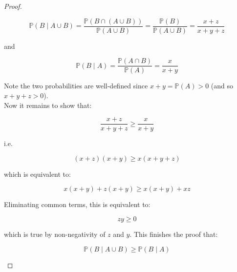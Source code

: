 \begin{proof}
\begin{itemize}
  \[\mathbb{P}(\mathit{B} \mid \mathit{A} \cup \mathit{B}) = \frac{\mathbb{P}(\mathit{B} \cap (\mathit{A} \cup \mathit{B}))}{\mathbb{P}(\mathit{A} \cup \mathit{B})} = \frac{\mathbb{P}(\mathit{B})}{\mathbb{P}(\mathit{A} \cup \mathit{B})} = \frac{\mathit{x} + \mathit{z}}{\mathit{x} + \mathit{y} + \mathit{z}}\]

  and

  \[\mathbb{P}(\mathit{B} \mid \mathit{A}) = \frac{\mathbb{P}(\mathit{A} \cap \mathit{B})}{\mathbb{P}(\mathit{A})} = \frac{\mathit{x}}{\mathit{x} + \mathit{y}}\]

  Note the two probabilities are well-defined since \(\mathit{x} + \mathit{y} = \mathbb{P}(\mathit{A}) > 0\) (and so \(\mathit{x} + \mathit{y} + \mathit{z} > 0\)).\\
  Now it remains to show that:

  \[\frac{\mathit{x} + \mathit{z}}{\mathit{x} + \mathit{y} + \mathit{z}} \geq \frac{\mathit{x}}{\mathit{x} + \mathit{y}}\]

  i.e.

  \[(\mathit{x} + \mathit{z})(\mathit{x} + \mathit{y}) \geq \mathit{x}(\mathit{x} + \mathit{y} + \mathit{z})\]

  which is equivalent to:

  \[\mathit{x}(\mathit{x} + \mathit{y}) + \mathit{z}(\mathit{x} + \mathit{y}) \geq \mathit{x}(\mathit{x} + \mathit{y}) + \mathit{x}\mathit{z}\]

  Eliminating common terms, this is equivalent to:

  \[\mathit{z}\mathit{y} \geq 0\]

  which is true by non-negativity of \(\mathit{z}\) and \(\mathit{y}\). This finishes the proof that:

  \[\mathbb{P}(\mathit{B} \mid \mathit{A} \cup \mathit{B}) \geq \mathbb{P}(\mathit{B} \mid \mathit{A})\]
\end{itemize}

\end{proof}
